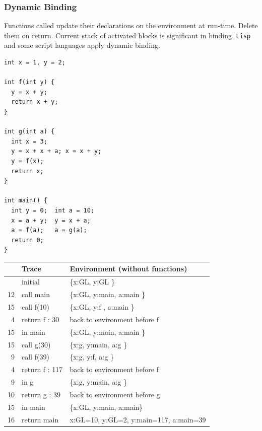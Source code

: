 \subsubsection{Dynamic Binding}

Functions called update their declarations on the environment at run-time. Delete them on return. Current stack of activated blocks is significant in binding. \texttt{Lisp} and some script languages apply dynamic binding.

\begin{dummyenv}

\begin{minipage}[c]{0.35\textwidth}

\begin{listing}[H]

\begin{verbatim}
int x = 1, y = 2;

int f(int y) {
  y = x + y;      
  return x + y;
}

int g(int a) {
  int x = 3;       
  y = x + x + a; x = x + y;    
  y = f(x);
  return x;
}

int main() {
  int y = 0;  int a = 10;  
  x = a + y;  y = x + a;    
  a = f(a);   a = g(a);
  return 0;
}
\end{verbatim}
\caption{}
\label{code:code6}
\end{listing}

\end{minipage} %
\begin{minipage}[c]{0.65\textwidth}
\begin{dummyenv}
\def\T{\rule{0pt}{1em}\hspace*{1em}}
\noindent\normalsize\begin{tabular}{rll}
& Trace & Environment (without functions)\\ \hline
& initial & \{x:GL, y:GL \} \\ \rowcolor{blue!5}
12& call main & \{x:GL, y:main, a:main \} \\ \rowcolor{blue!15}
15&\T call f(10)  & \{x:GL, y:f , a:main \} \\ \rowcolor{blue!15}
4 &\T return f : 30 & back to environment before f  \\ \rowcolor{blue!5}
15& in main & \{x:GL, y:main, a:main \} \\ \rowcolor{blue!10}
15&\T call g(30) & \{x:g, y:main, a:g  \} \\ \rowcolor{blue!25}
9&\T\T call f(39) & \{x:g, y:f, a:g  \} \\ \rowcolor{blue!25}
4&\T\T return f : 117 & back to environment before f\\ \rowcolor{blue!10}
9&\T in g  & \{x:g, y:main, a:g  \} \\ \rowcolor{blue!10}
10&\T return g : 39 & back to environment before g \\ \rowcolor{blue!5}
15& in main & \{x:GL, y:main, a:main\} \\ \rowcolor{blue!5}
16& return main & x:GL=10, y:GL=2, y:main=117, a:main=39 \\
\end{tabular}
\end{dummyenv}


\end{minipage}
\end{dummyenv}
